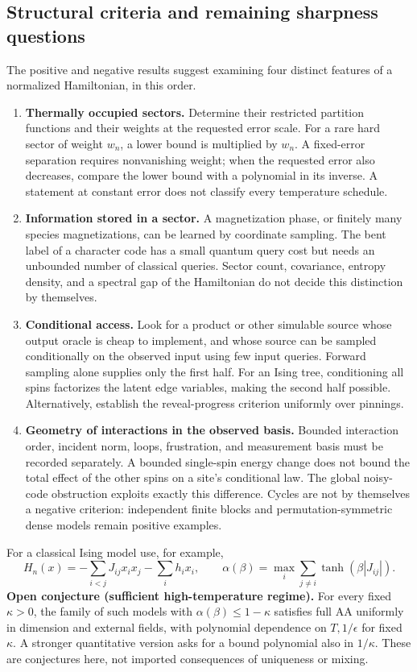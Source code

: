 \subsection{Structural criteria and remaining sharpness questions}
\label{tht:program}

The positive and negative results suggest examining four distinct
features of a normalized Hamiltonian, in this order.

\begin{enumerate}
\item \textbf{Thermally occupied sectors.} Determine their restricted
partition functions and their weights at the requested error scale.
For a rare hard sector of weight $w_n$, a lower bound is multiplied by
$w_n$. A fixed-error separation requires nonvanishing weight; when the
requested error also decreases, compare the lower bound with a
polynomial in its inverse. A statement at constant error does not
classify every temperature schedule.
\item \textbf{Information stored in a sector.} A magnetization phase,
or finitely many species magnetizations, can be learned by coordinate
sampling. The bent label of a character code has a small quantum query
cost but needs an unbounded number of classical queries. Sector count,
covariance, entropy density, and a spectral gap of the Hamiltonian do
not decide this distinction by themselves.
\item \textbf{Conditional access.} Look for a product or other
simulable source whose output oracle is cheap to implement, and whose
source can be sampled conditionally on the observed input using few
input queries. Forward sampling alone supplies only the first half.
For an Ising tree, conditioning all spins factorizes the latent edge
variables, making the second half possible. Alternatively, establish
the reveal-progress criterion uniformly over pinnings.
\item \textbf{Geometry of interactions in the observed basis.}
Bounded interaction order, incident norm, loops, frustration, and
measurement basis must be recorded separately. A bounded single-spin
energy change does not bound the total effect of the other spins on a
site's conditional law. The global noisy-code obstruction exploits
exactly this difference. Cycles are not by themselves a negative
criterion: independent finite blocks and permutation-symmetric dense
models remain positive examples.
\end{enumerate}

For a classical Ising model use, for example,
\[
 H_n(x)=-\sum_{i<j}J_{ij}x_ix_j-\sum_i h_i x_i,
 \qquad \alpha(\beta)=\max_i\sum_{j\ne i}
                  \tanh(\beta|J_{ij}|).
\]
\textbf{Open conjecture (sufficient high-temperature regime).}
For every fixed $\kappa>0$, the family of such models with
$\alpha(\beta)\le1-\kappa$ satisfies full AA uniformly in dimension
and external fields, with polynomial dependence on $T,1/\epsilon$
for fixed $\kappa$. A stronger quantitative version asks for a bound
polynomial also in $1/\kappa$. These are conjectures here, not imported
consequences of uniqueness or mixing.

